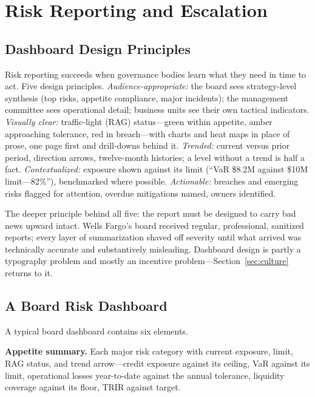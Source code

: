 \documentclass[11pt,openany]{book}
\begin{document}
\section{Risk Reporting and Escalation}
\label{sec:reporting}

\subsection{Dashboard Design Principles}

Risk reporting succeeds when governance bodies learn what they need in time
to act. Five design principles. \emph{Audience-appropriate:} the board sees
strategy-level synthesis (top risks, appetite compliance, major incidents);
the management committee sees operational detail; business units see their
own tactical indicators. \emph{Visually clear:} traffic-light (RAG)
status---green within appetite, amber approaching tolerance, red in
breach---with charts and heat maps in place of prose, one page first and
drill-downs behind it. \emph{Trended:} current versus prior period, direction
arrows, twelve-month histories; a level without a trend is half a fact.
\emph{Contextualized:} exposure shown against its limit (``VaR \$8.2M against
\$10M limit---82\%''), benchmarked where possible. \emph{Actionable:}
breaches and emerging risks flagged for attention, overdue mitigations named,
owners identified.

The deeper principle behind all five: the report must be designed to carry
bad news upward intact. Wells Fargo's board received regular, professional,
sanitized reports; every layer of summarization shaved off severity until
what arrived was technically accurate and substantively misleading. Dashboard
design is partly a typography problem and mostly an incentive
problem---Section~\ref{sec:culture} returns to it.

\subsection{A Board Risk Dashboard}

A typical board dashboard contains six elements.

\textbf{Appetite summary.} Each major risk category with current exposure,
limit, RAG status, and trend arrow---credit exposure against its ceiling, VaR
against its limit, operational losses year-to-date against the annual
tolerance, liquidity coverage against its floor, TRIR against target.
\end{document}
